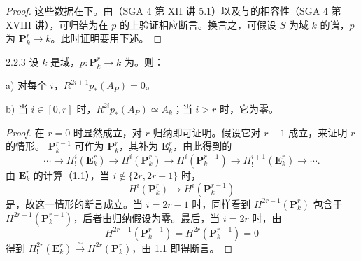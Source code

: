 \begin{proof}
这些数据在下。由（SGA 4 第 XII 讲 5.1）以及与的相容性（SGA 4 第 XVIII 讲），可归结为在 $p$ 的上验证相应断言。换言之，可假设 $S$ 为域 $k$ 的谱，$p$ 为 $\mathbf P_k^r\to k$。此时证明要用下述。
\end{proof}

\begin{SGAresult}{}{2.2.3}
设 $k$ 是域，$p:\mathbf P_k^r\to k$ 为。则：

a) 对每个 $i$，$R^{2i+1}p_*(A_P)=0$。

b) 当 $i\in[0,r]$ 时，$R^{2i}p_*(A_P)\simeq A_k$；当 $i>r$ 时，它为零。
\end{SGAresult}
\begin{proof}
在 $r=0$ 时显然成立，对 $r$ 归纳即可证明。假设它对 $r-1$ 成立，来证明 $r$ 的情形。 $\mathbf P_k^{r-1}$ 可作为 $\mathbf P_k^r$，其补为 $\mathbf E_k^r$，由此得到的
\[
 \cdots\longrightarrow H_!^i(\mathbf E_k^r)\longrightarrow H^i(\mathbf P_k^r)
 \longrightarrow H^i(\mathbf P_k^{r-1})\longrightarrow H_!^{i+1}(\mathbf E_k^r)\longrightarrow\cdots.
\]
由 $\mathbf E_k^r$ 的计算（1.1），当 $i\notin\{2r,2r-1\}$ 时，
\[
 H^i(\mathbf P_k^r)\longrightarrow H^i(\mathbf P_k^{r-1})
\]
是，故这一情形的断言成立。当 $i=2r-1$ 时，同样看到 $H^{2r-1}(\mathbf P_k^r)$ 包含于 $H^{2r-1}(\mathbf P_k^{r-1})$，后者由归纳假设为零。最后，当 $i=2r$ 时，由
\[
 H^{2r-1}(\mathbf P_k^{r-1})=H^{2r}(\mathbf P_k^{r-1})=0
\]
得到 $H_!^{2r}(\mathbf E_k^r)\xrightarrow{\sim}H^{2r}(\mathbf P_k^r)$，由 1.1 即得断言。
\end{proof}

